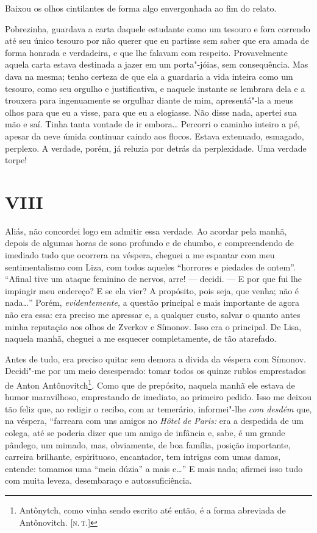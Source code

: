 Baixou os olhos cintilantes de forma algo envergonhada ao fim do relato.

Pobrezinha, guardava a carta daquele estudante como um tesouro e fora
correndo até seu único tesouro por não querer que eu partisse sem saber
que era amada de forma honrada e verdadeira, e que lhe falavam com
respeito. Provavelmente aquela carta estava destinada a jazer em um
porta"-jóias, sem consequência. Mas dava na mesma; tenho certeza de que
ela a guardaria a vida inteira como um tesouro, como seu orgulho e
justificativa, e naquele instante se lembrara dela e a trouxera para
ingenuamente se orgulhar diante de mim, apresentá"-la a meus olhos para
que eu a visse, para que eu a elogiasse. Não disse nada, apertei sua mão
e saí. Tinha tanta vontade de ir embora\ldots{} Percorri o caminho inteiro a
pé, apesar da neve úmida continuar caindo aos flocos. Estava extenuado,
esmagado, perplexo. A verdade, porém, já reluzia por detrás da
perplexidade. Uma verdade torpe!

\section{VIII}

Aliás, não concordei logo em admitir essa verdade. Ao acordar pela
manhã, depois de algumas horas de sono profundo e de chumbo, e
compreendendo de imediado tudo que ocorrera na véspera, cheguei a me
espantar com meu sentimentalismo com Liza, com todos aqueles ``horrores
e piedades de ontem''. ``Afinal tive um ataque feminino de nervos, arre!
--- decidi. --- E por que fui lhe impingir meu endereço? E se ela vier? A
propósito, pois seja, que venha; não é nada\ldots{}'' Porém,
\emph{evidentemente,} a questão principal e mais importante de agora não
era essa: era preciso me apressar e, a qualquer custo, salvar o quanto
antes minha reputação aos olhos de Zverkov e Símonov. Isso era o
principal. De Lisa, naquela manhã, cheguei a me esquecer completamente,
de tão atarefado.

Antes de tudo, era preciso quitar sem demora a divida da véspera com
Símonov. Decidi"-me por um meio desesperado: tomar todos os quinze rublos
emprestados de Anton Antônovitch\footnote{Antônytch, como vinha sendo
  escrito até então, é a forma abreviada de Antônovitch. {[}\textsc{n.\,t.}{]}}.
Como que de prepósito, naquela manhã ele estava de humor maravilhoso,
emprestando de imediato, ao primeiro pedido. Isso me deixou tão feliz
que, ao redigir o recibo, com ar temerário, informei"-lhe \emph{com
desdém} que, na véspera, ``farreara com uns amigos no \emph{Hôtel de
Paris:} era a despedida de um colega, até se poderia dizer que um amigo
de infância e, sabe, é um grande pândego, um mimado, mas, obviamente, de
boa família, posição importante, carreira brilhante, espirituoso,
encantador, tem intrigas com umas damas, entende: tomamos uma ``meia
dúzia'' a mais e\ldots{}'' E mais nada; afirmei isso tudo com muita leveza,
desembaraço e autossuficiência.

